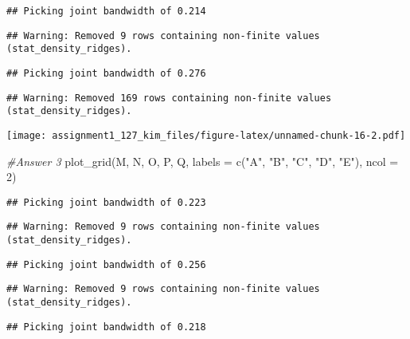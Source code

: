 \documentclass[
]{article}
\newenvironment{Shaded}{\begin{snugshade}}{\end{snugshade}}
\newcommand{\AttributeTok}[1]{\textcolor[rgb]{0.77,0.63,0.00}{#1}}
\newcommand{\CommentTok}[1]{\textcolor[rgb]{0.56,0.35,0.01}{\textit{#1}}}
\newcommand{\DecValTok}[1]{\textcolor[rgb]{0.00,0.00,0.81}{#1}}
\newcommand{\FunctionTok}[1]{\textcolor[rgb]{0.00,0.00,0.00}{#1}}
\newcommand{\NormalTok}[1]{#1}
\newcommand{\StringTok}[1]{\textcolor[rgb]{0.31,0.60,0.02}{#1}}
\begin{document}
\begin{verbatim}
## Picking joint bandwidth of 0.214
\end{verbatim}

\begin{verbatim}
## Warning: Removed 9 rows containing non-finite values (stat_density_ridges).
\end{verbatim}

\begin{verbatim}
## Picking joint bandwidth of 0.276
\end{verbatim}

\begin{verbatim}
## Warning: Removed 169 rows containing non-finite values (stat_density_ridges).
\end{verbatim}

\texttt{[image: assignment1\_127\_kim\_files/figure-latex/unnamed-chunk-16-2.pdf]}

\begin{Shaded}
\begin{Highlighting}[]
\CommentTok{\#Answer 3}
\FunctionTok{plot\_grid}\NormalTok{(M, N, O, P, Q,}
          \AttributeTok{labels =} \FunctionTok{c}\NormalTok{(}\StringTok{"A"}\NormalTok{, }\StringTok{"B"}\NormalTok{, }\StringTok{"C"}\NormalTok{, }\StringTok{"D"}\NormalTok{, }\StringTok{"E"}\NormalTok{),}
          \AttributeTok{ncol =} \DecValTok{2}\NormalTok{)}
\end{Highlighting}
\end{Shaded}

\begin{verbatim}
## Picking joint bandwidth of 0.223
\end{verbatim}

\begin{verbatim}
## Warning: Removed 9 rows containing non-finite values (stat_density_ridges).
\end{verbatim}

\begin{verbatim}
## Picking joint bandwidth of 0.256
\end{verbatim}

\begin{verbatim}
## Warning: Removed 9 rows containing non-finite values (stat_density_ridges).
\end{verbatim}

\begin{verbatim}
## Picking joint bandwidth of 0.218
\end{verbatim}
\end{document}
